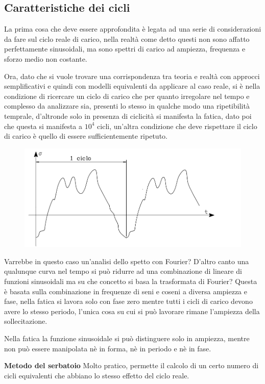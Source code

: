 \subsection{Caratteristiche dei cicli 	}	 
		La prima cosa che deve essere  approfondita è legata ad una serie di considerazioni da fare sul ciclo reale di carico, nella realtà come detto questi non sono affatto perfettamente sinusoidali, ma sono spettri di carico ad ampiezza, frequenza e sforzo medio non costante. 
		
		Ora, dato che si vuole trovare una corrispondenza tra teoria e realtà con approcci semplificativi e quindi con modelli equivalenti da applicare al caso reale, si è nella condizione di ricercare un ciclo di carico che per quanto irregolare nel tempo e complesso da analizzare sia, presenti lo stesso in qualche modo una ripetibilità temprale, d'altronde solo in presenza di ciclicità si manifesta la fatica, dato poi che questa si manifesta a $10^4$ cicli, un'altra condizione che deve rispettare il ciclo di carico è quello di essere sufficientemente ripetuto.
		
		\begin{figure}[H]
			\centering
			\includegraphics[width=0.5\linewidth]{immagini_10/screenshot013}
			\label{fig:screenshot013}
		\end{figure}
		 
		 Varrebbe in questo caso un'analisi dello spetto con Fourier? D'altro canto una qualunque curva nel tempo si può ridurre ad una combinazione di lineare di funzioni sinusoidali ma su che concetto si basa la trasformata di Fourier? Questa è basata sulla combinazione in frequenze di seni e coseni a diversa ampiezza e fase, nella fatica si lavora solo con fase zero mentre tutti i cicli di carico devono avere lo stesso periodo, l'unica cosa su cui si può lavorare rimane l'ampiezza della sollecitazione. 
		 
		 Nella fatica la funzione sinusoidale si può distinguere solo in ampiezza, mentre non può essere manipolata nè in forma, nè in periodo e nè in fase.\newline
		  
		 \textbf{Metodo del serbatoio}\newline
		 Molto pratico, permette il calcolo di un certo numero di cicli equivalenti che abbiano lo stesso effetto del ciclo reale.
		  
